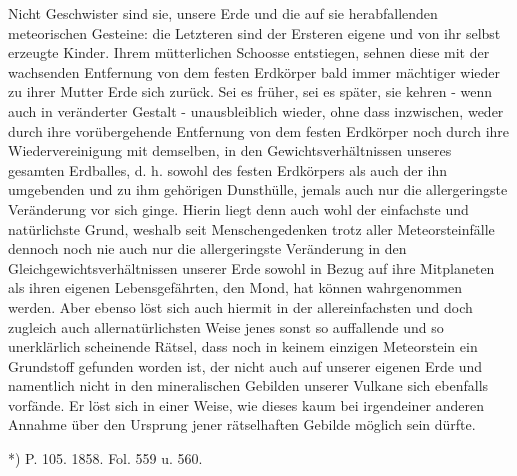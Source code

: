 \documentclass[a4paper, 11pt, oneside, polutonikogreek, german]{article}
\begin{document}
Nicht Geschwister sind sie, unsere Erde und die auf sie herabfallenden meteorischen Gesteine: die Letzteren sind der Ersteren eigene und von ihr selbst erzeugte Kinder. Ihrem mütterlichen Schoosse entstiegen, sehnen diese mit der wachsenden Entfernung von dem festen Erdkörper bald immer mächtiger wieder zu ihrer Mutter Erde sich zurück. Sei es früher, sei es später, sie kehren - wenn auch in veränderter Gestalt - unausbleiblich wieder, ohne dass inzwischen, weder durch ihre vorübergehende Entfernung von dem festen Erdkörper noch durch ihre Wiedervereinigung mit demselben, in den Gewichtsverhältnissen unseres gesamten Erdballes, d. h. sowohl des festen Erdkörpers als auch der ihn umgebenden und zu ihm gehörigen Dunsthülle, jemals auch nur die allergeringste Veränderung vor sich ginge. Hierin liegt denn auch wohl der einfachste und natürlichste Grund, weshalb seit Menschengedenken trotz aller Meteorsteinfälle dennoch noch nie auch nur die allergeringste Veränderung in den Gleichgewichtsverhältnissen unserer Erde sowohl in Bezug auf ihre Mitplaneten als ihren eigenen Lebensgefährten, den Mond, hat können wahrgenommen werden. Aber ebenso löst sich auch hiermit in der allereinfachsten und doch zugleich auch allernatürlichsten Weise jenes sonst so auffallende und so unerklärlich scheinende Rätsel, dass noch in keinem einzigen Meteorstein ein Grundstoff gefunden worden ist, der nicht auch auf unserer eigenen Erde und namentlich nicht in den mineralischen Gebilden unserer Vulkane sich ebenfalls vorfände. Er löst sich in einer Weise, wie dieses kaum bei irgendeiner anderen Annahme über den Ursprung jener rätselhaften Gebilde möglich sein dürfte.

*) P. 105. 1858. Fol. 559 u. 560.
\end{document}
